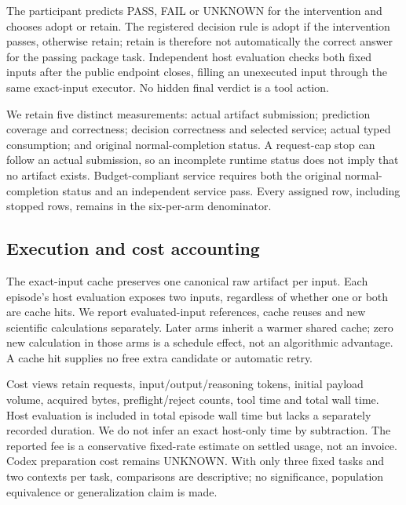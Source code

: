 The participant predicts PASS, FAIL or UNKNOWN for the intervention and chooses
adopt or retain. The registered decision rule is adopt if the intervention
passes, otherwise retain; retain is therefore not automatically the correct
answer for the passing package task. Independent host evaluation checks both
fixed inputs after the public endpoint closes, filling an unexecuted input
through the same exact-input executor. No hidden final verdict is a tool action.

We retain five distinct measurements: actual artifact submission; prediction
coverage and correctness; decision correctness and selected service; actual
typed consumption; and original normal-completion status. A request-cap stop
can follow an actual submission, so an incomplete runtime status does not imply
that no artifact exists. Budget-compliant service requires both the original
normal-completion status and an independent service pass. Every assigned row,
including stopped rows, remains in the six-per-arm denominator.

\subsection{Execution and cost accounting}
The exact-input cache preserves one canonical raw artifact per input. Each
episode's host evaluation exposes two inputs, regardless of whether one or
both are cache hits. We report evaluated-input references, cache reuses and new
scientific calculations separately. Later arms inherit a warmer shared cache;
zero new calculation in those arms is a schedule effect, not an algorithmic
advantage. A cache hit supplies no free extra candidate or automatic retry.

Cost views retain requests, input/output/reasoning tokens, initial payload
volume, acquired bytes, preflight/reject counts, tool time and total wall time.
Host evaluation is included in total episode wall time but lacks a separately
recorded duration. We do not infer an exact host-only time by subtraction.
The reported fee is a conservative fixed-rate estimate on settled usage,
not an invoice. Codex preparation cost remains UNKNOWN. With only three fixed
tasks and two contexts per task, comparisons are descriptive; no significance,
population equivalence or generalization claim is made.
\FloatBarrier

